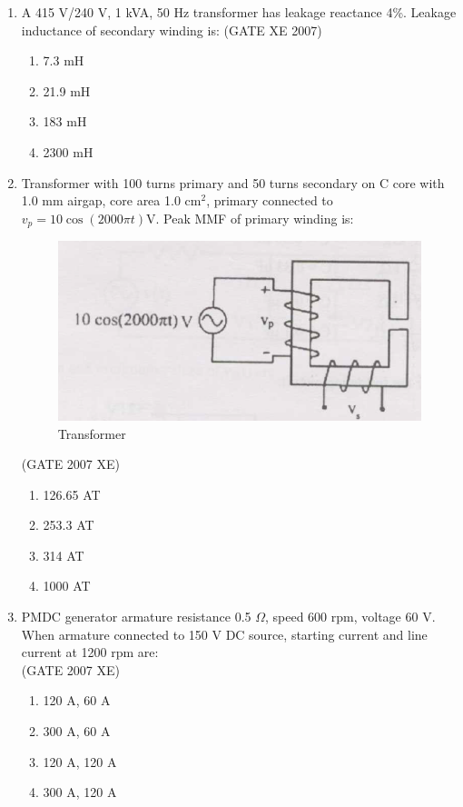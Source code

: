 \documentclass[journal,cmex10]{IEEEtran}
\theoremstyle{remark}
\numberwithin{equation}{enumi}
\numberwithin{figure}{enumi}
\begin{document}
\begin{enumerate}
    \item A 415 V/240 V, 1 kVA, 50 Hz transformer has leakage reactance 4\%. Leakage inductance of secondary winding is:
    \hfill{(GATE XE 2007)}
    \begin{multicols}{4}
    \begin{enumerate}
        \item 7.3 mH
        \item 21.9 mH
        \item 183 mH
        \item 2300 mH
    \end{enumerate}
    \end{multicols}

    \item Transformer with 100 turns primary and 50 turns secondary on C core with 1.0 mm airgap, core area 1.0 cm$^2$, primary connected to $v_p=10\cos (2000\pi t)$V. Peak MMF of primary winding is:
   \begin{figure}[htbp]
  \centering
  \includegraphics[width=0.6\columnwidth]{figs/C/fig6.png}
  \caption{Transformer}
  \label{fig:C/fig6.png}
\end{figure}
    \hfill{(GATE 2007 XE)}
    \begin{multicols}{4}
    \begin{enumerate}
        \item 126.65 AT
        \item 253.3 AT
        \item 314 AT
        \item 1000 AT
    \end{enumerate}
    \end{multicols}

\newpage

    \item PMDC generator armature resistance 0.5 $\Omega$, speed 600 rpm, voltage 60 V. When armature connected to 150 V DC source, starting current and line current at 1200 rpm are:\\
    \hfill{(GATE 2007 XE)}
    \begin{multicols}{4}
    \begin{enumerate}
        \item 120 A, 60 A
        \item 300 A, 60 A
        \item 120 A, 120 A
        \item 300 A, 120 A
    \end{enumerate}
\end{multicols}


\end{enumerate}
\end{document}
